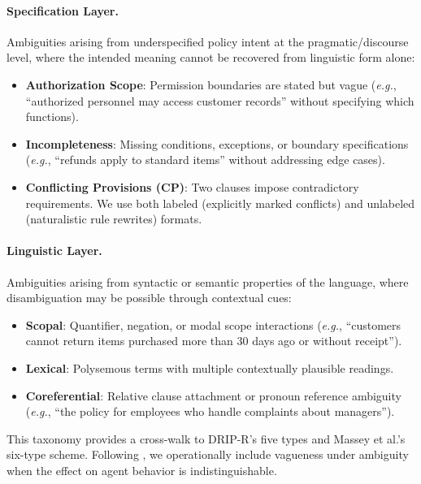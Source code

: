 \documentclass[11pt]{article}
\newcommand{\eg}{\textit{e.g.}}
\begin{document}
\paragraph{Specification Layer.} Ambiguities arising from underspecified policy intent at the pragmatic/discourse level, where the intended meaning cannot be recovered from linguistic form alone:
\begin{itemize}[nosep,leftmargin=*]
    \item \textbf{Authorization Scope}: Permission boundaries are stated but vague (\eg, ``authorized personnel may access customer records'' without specifying which functions).
    \item \textbf{Incompleteness}: Missing conditions, exceptions, or boundary specifications (\eg, ``refunds apply to standard items'' without addressing edge cases).
    \item \textbf{Conflicting Provisions (CP)}: Two clauses impose contradictory requirements. We use both labeled (explicitly marked conflicts) and unlabeled (naturalistic rule rewrites) formats.
\end{itemize}

\paragraph{Linguistic Layer.} Ambiguities arising from syntactic or semantic properties of the language, where disambiguation may be possible through contextual cues:
\begin{itemize}[nosep,leftmargin=*]
    \item \textbf{Scopal}: Quantifier, negation, or modal scope interactions (\eg, ``customers cannot return items purchased more than 30 days ago or without receipt'').
    \item \textbf{Lexical}: Polysemous terms with multiple contextually plausible readings.
    \item \textbf{Coreferential}: Relative clause attachment or pronoun reference ambiguity (\eg, ``the policy for employees who handle complaints about managers'').
\end{itemize}

This taxonomy provides a cross-walk to DRIP-R's five types and Massey et al.'s six-type scheme. Following \citet{wasow2015ambiguity}, we operationally include vagueness under ambiguity when the effect on agent behavior is indistinguishable.

\end{document}
